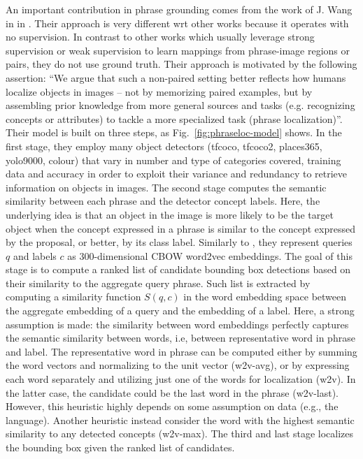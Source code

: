 An important contribution in phrase grounding comes from the work of
J. Wang in \etal{} in \cite{wang2019phrase}. Their approach is very
different wrt other works because it operates with no supervision. In
contrast to other works which usually leverage strong supervision or
weak supervision to learn mappings from phrase-image regions or pairs,
they do not use ground truth. Their approach is motivated by the
following assertion: ``We argue that such a non-paired setting better
reflects how humans localize objects in images -- not by memorizing
paired examples, but by assembling prior knowledge from more general
sources and tasks (e.g. recognizing concepts or attributes) to tackle
a more specialized task (phrase localization)''. Their model is built
on three steps, as Fig.~\ref{fig:phraseloc-model} shows. In the first
stage, they employ many object detectors (tfcoco, tfcoco2, places365,
yolo9000, colour) that vary in number and type of categories covered,
training data and accuracy in order to exploit their variance and
redundancy to retrieve information on objects in images. The second
stage computes the semantic similarity between each phrase and the
detector concept labels. Here, the underlying idea is that an object
in the image is more likely to be the target object when the concept
expressed in a phrase is similar to the concept expressed by the
proposal, or better, by its class label. Similarly to
\cite{chen2018knowledge}, they represent queries $q$ and labels $c$ as
$300$-dimensional CBOW word2vec embeddings. The goal of this stage is
to compute a ranked list of candidate bounding box detections based on
their similarity to the aggregate query phrase. Such list is extracted
by computing a similarity function $S(q, c)$ in the word embedding
space between the aggregate embedding of a query and the embedding of
a label. Here, a strong assumption is made: the similarity between
word embeddings perfectly captures the semantic similarity between
words, i.e, between representative word in phrase and label. The
representative word in phrase can be computed either by summing the
word vectors and normalizing to the unit vector (w2v-avg), or by
expressing each word separately and utilizing just one of the words
for localization (w2v). In the latter case, the candidate could be the
last word in the phrase (w2v-last). However, this heuristic highly
depends on some assumption on data (e.g., the language). Another
heuristic instead consider the word with the highest semantic
similarity to any detected concepts (w2v-max). The third and last
stage localizes the bounding box given the ranked list of candidates.
